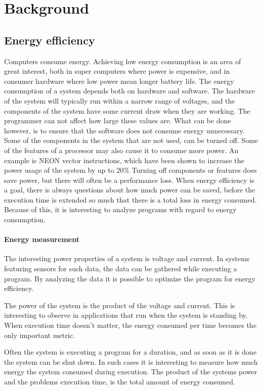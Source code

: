 \chapter[Background]{Background}

\section{Energy efficiency} \label{energymeasurement}
Computers consume energy.
Achieving low energy consumption is an area of great interest, both in super computers where power is expensive, and in consumer hardware where low power mean longer battery life.
The energy consumption of a system depends both on hardware and software.
The hardware of the system will typically run within a narrow range of voltages, and the components of the system have some current draw when they are working.
The programmer can not affect how large these values are.
What can be done however, is to ensure that the software does not consume energy unnecessary.
Some of the components in the system that are not used, can be turned off.
Some of the features of a processor may also cause it to consume more power.
An example is NEON vector instructions, which have been shown to increase the power usage of the system by up to 20\%%
Turning off components or features does save power, but there will often be a performance loss.
When energy efficiency is a goal, there is always questions about how much power can be saved, before the execution time is extended so much that there is a total loss in energy consumed.
Because of this, it is interesting to analyze programs with regard to energy consumption.

\subsubsection{Energy measurement}
The interesting power properties of a system is voltage and current.
In systems featuring sensors for such data, the data can be gathered while executing a program.
By analyzing the data it is possible to optimize the program for energy efficiency.

The power of the system is the product of the voltage and current.
This is interesting to observe in applications that run when the system is standing by.
When execution time doesn't matter, the energy consumed per time becomes the only important metric.

Often the system is executing a program for a duration, and as soon as it is done the system can be shut down.
In such cases it is interesting to measure how much energy the system consumed during execution.
The product of the systems power and the problems execution time, is the total amount of energy consumed.

